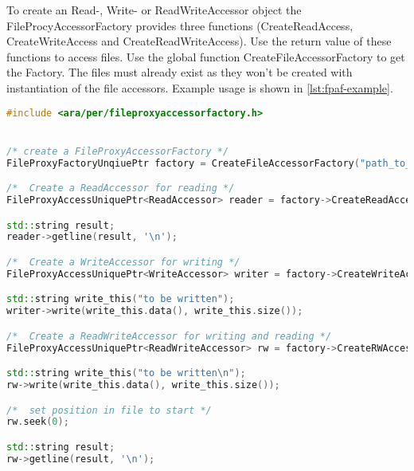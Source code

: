 To create an Read-, Write- or ReadWriteAccessor object the
FileProcyAccessorFactory provides three functions
(CreateReadAccess, CreateWriteAccess and CreateReadWriteAccess). Use the return
value of these functions to access
files. Use the global function CreateFileAccessorFactory to get the Factory.
The files must already exist as they won't
be created with instantiation of the file accessors. Example usage is shown in
\ref{lst:fpaf-example}.

\begin{lstlisting}[language=C++, caption={Example usage of the FileProxyAccessorFactory and Read-, Write- and ReadWriteAccessor}, captionpos=b, label={lst:fpaf-example}]
#include <ara/per/fileproxyaccessorfactory.h>


/* create a FileProxyAccessorFactory */
FileProxyFactoryUnqiuePtr factory = CreateFileAccessorFactory("path_to_files");

/*  Create a ReadAccessor for reading */
FileProxyAccessUniquePtr<ReadAccessor> reader = factory->CreateReadAccess("file_to_read", BasicOperations::OpenMode::in);

std::string result;
reader->getline(result, '\n');

/*  Create a WriteAccessor for writing */
FileProxyAccessUniquePtr<WriteAccessor> writer = factory->CreateWriteAccess("file_to_write", BasicOperations::OpenMode::out);

std::string write_this("to be written");
writer->write(write_this.data(), write_this.size());

/*  Create a ReadWriteAccessor for writing and reading */
FileProxyAccessUniquePtr<ReadWriteAccessor> rw = factory->CreateRWAccess("file_to_write", BasicOperations::OpenMode::in | BasicOperations::OpenMode::out);

std::string write_this("to be written\n");
rw->write(write_this.data(), write_this.size());

/*  set position in file to start */
rw.seek(0);

std::string result;
rw->getline(result, '\n');

\end{lstlisting}